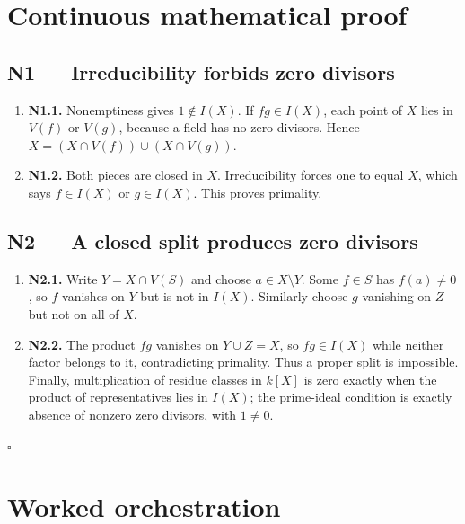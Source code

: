 \documentclass[preprint,12pt,aps,pra,showkeys,amsmath,amssymb,superscriptaddress,floatfix]{revtex4-2}
\theoremstyle{definition}
\theoremstyle{remark}
\begin{document}
\endgroup\clearpage\section{Continuous mathematical proof}\label{sec:proof}

\subsection{N1 --- Irreducibility forbids zero
divisors}\label{n1-irreducibility-forbids-zero-divisors}

\begin{enumerate}
\def\labelenumi{\arabic{enumi}.}
\item
  \textbf{N1.1.} Nonemptiness gives \(1\notin I(X)\). If \(fg\in I(X)\),
  each point of \(X\) lies in \(V(f)\) or \(V(g)\), because a field has
  no zero divisors. Hence \(X=(X\cap V(f))\cup(X\cap V(g))\).
\item
  \textbf{N1.2.} Both pieces are closed in \(X\). Irreducibility forces
  one to equal \(X\), which says \(f\in I(X)\) or \(g\in I(X)\). This
  proves primality.
\end{enumerate}

\subsection{N2 --- A closed split produces zero
divisors}\label{n2-a-closed-split-produces-zero-divisors}

\begin{enumerate}
\def\labelenumi{\arabic{enumi}.}
\item
  \textbf{N2.1.} Write \(Y=X\cap V(S)\) and choose
  \(a\in X\setminus Y\). Some \(f\in S\) has \(f(a)\ne0\), so \(f\)
  vanishes on \(Y\) but is not in \(I(X)\). Similarly choose \(g\)
  vanishing on \(Z\) but not on all of \(X\).
\item
  \textbf{N2.2.} The product \(fg\) vanishes on \(Y\cup Z=X\), so
  \(fg\in I(X)\) while neither factor belongs to it, contradicting
  primality. Thus a proper split is impossible. Finally, multiplication
  of residue classes in \(k[X]\) is zero exactly when the product of
  representatives lies in \(I(X)\); the prime-ideal condition is exactly
  absence of nonzero zero divisors, with \(1\ne0\).
\end{enumerate}

\hfill$\square$

\section{Worked orchestration}
\end{document}
